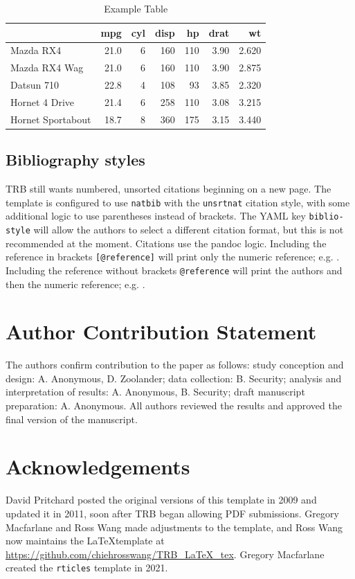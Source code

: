 \documentclass[numbered]{trbunofficial}
\begin{document}
\begin{table}

\caption{\label{tab:table-example}Example Table}
\centering
\begin{tabular}[t]{lrrrrrr}
\toprule
  & mpg & cyl & disp & hp & drat & wt\\
\midrule
Mazda RX4 & 21.0 & 6 & 160 & 110 & 3.90 & 2.620\\
Mazda RX4 Wag & 21.0 & 6 & 160 & 110 & 3.90 & 2.875\\
Datsun 710 & 22.8 & 4 & 108 & 93 & 3.85 & 2.320\\
Hornet 4 Drive & 21.4 & 6 & 258 & 110 & 3.08 & 3.215\\
Hornet Sportabout & 18.7 & 8 & 360 & 175 & 3.15 & 3.440\\
\bottomrule
\end{tabular}
\end{table}

\subsection{Bibliography styles}\label{bibliography-styles}

TRB still wants numbered, unsorted citations beginning on a new page.
The template is configured to use \texttt{natbib} with the
\texttt{unsrtnat} citation style, with some additional logic to use
parentheses instead of brackets. The YAML key \texttt{biblio-style} will
allow the authors to select a different citation format, but this is not
recommended at the moment. Citations use the pandoc logic. Including the
reference in brackets \texttt{{[}@reference{]}} will print only the
numeric reference; e.g. \citep{Feynman1963118, Dirac1953888}. Including
the reference without brackets \texttt{@reference} will print the
authors and then the numeric reference; e.g. \citet{Feynman1963118}.

\section{Author Contribution
Statement}\label{author-contribution-statement}

The authors confirm contribution to the paper as follows: study
conception and design: A. Anonymous, D. Zoolander; data collection: B.
Security; analysis and interpretation of results: A. Anonymous, B.
Security; draft manuscript preparation: A. Anonymous. All authors
reviewed the results and approved the final version of the manuscript.

\section{Acknowledgements}\label{acknowledgements}

David Pritchard posted the original versions of this template in 2009
and updated it in 2011, soon after TRB began allowing PDF submissions.
Gregory Macfarlane and Ross Wang made adjustments to the template, and
Ross Wang now maintains the \LaTeX template at
\url{https://github.com/chiehrosswang/TRB_LaTeX_tex}. Gregory Macfarlane
created the \texttt{rticles} template in 2021.

\newpage
\renewcommand\refname{References}

\end{document}
